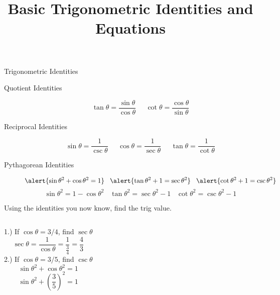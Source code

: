 \documentclass{beamer}
\title{Basic Trigonometric Identities and Equations}
\date{}
\begin{document}
\frame{\titlepage}

\begin{frame}{Trigonometric Identities}
    \begin{description}
        \item[Quotient Identities] {\begin{equation*}
            \tan{\theta}=\frac{\sin{\theta}}{\cos{\theta}}\;\;\;\;\;
            \cot{\theta}=\frac{\cos{\theta}}{\sin{\theta}}
            
        \end{equation*}}
        
        \item[Reciprocal Identities] {\begin{equation*}
            \sin{\theta}=\frac{1}{\csc{\theta}}\;\;\;\;\;
            \cos{\theta}=\frac{1}{\sec{\theta}}\;\;\;\;\;
            \tan{\theta}=\frac{1}{\cot{\theta}}
        
        \end{equation*}}
        
        \item[Pythagorean Identities] {\begin{equation*}
            \alert{\sin{\theta} ^ 2 + \cos{\theta} ^ 2 = 1}\;\;\;
            \alert{\tan{\theta} ^ 2 + 1 = \sec{\theta} ^ 2}\;\;\;
            \alert{\cot{\theta} ^ 2 + 1 = \csc{\theta} ^ 2}
\end{equation*}
        \begin{equation*}    
            \sin{\theta} ^ 2 = 1 - \cos{\theta} ^ 2\;\;\;
            \tan{\theta} ^ 2 = \sec{\theta} ^ 2 - 1\;\;\;
            \cot{\theta} ^ 2 = \csc{\theta} ^ 2 - 1
            
        \end{equation*}}
    \end{description}
\end{frame}





\begin{frame}{Using the identities you now know, find the trig value.}
\begin{columns}
    1.) If $\cos{\theta} = 3/4$, find $\sec{\theta}$
    \begin{equation*}
        \sec{\theta}=\frac{1}{\cos{\theta}}=\frac{1}{\frac{3}{4}}=\frac{4}{3}
    \end{equation*}
    2.) If $\cos{\theta} = 3/5$, find $\csc{\theta}$
    \begin{equation*}
        \sin{\theta} ^ 2 + \cos{\theta} ^ 2 = 1
    \end{equation*}
    \begin{equation*}
        \sin{\theta} ^ 2 + (\frac{3}{5}) ^ 2 = 1
    \end{equation*}
\end{columns}

\end{frame}
\end{document}
